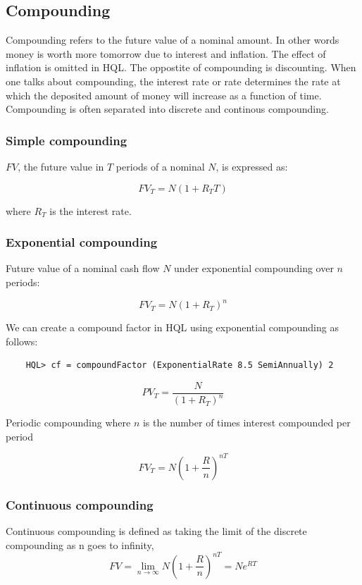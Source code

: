 \documentclass[11pt,a4paper]{article}
\numberwithin{equation}{section}
\begin{document}
\subsection{Compounding}
	Compounding refers to the future value of a nominal amount. In other words money is worth more tomorrow due to interest and inflation. The effect of inflation is omitted in HQL. The oppostite of compounding is discounting.
	When one talks about compounding, the interest rate or rate determines the rate at which the deposited amount of money will increase as a function of time.
	Compounding is often separated into discrete and continous compounding.


	\subsubsection{Simple compounding}
	$FV$, the future value in $T$ periods of a nominal $N$, is expressed as:

	\[
	FV_T = N(1+R_TT)
	\]

	where $R_T$ is the interest rate.

	\subsubsection{Exponential compounding}

	Future value of a nominal cash flow $N$ under exponential compounding over
	$n$ periods:

	\[ FV_T = N(1+R_T)^n \]


	We can create a compound factor in HQL using  exponential compounding as follows:

	\FrameSep
	\begin{lstlisting}
	HQL> cf = compoundFactor (ExponentialRate 8.5 SemiAnnually) 2
	\end{lstlisting}
	\FrameSep

	\[ PV_T = \frac{N}{(1+R_T)^n} \]

	Periodic compounding where $n$ is the number of times interest compounded per period

	\[
	FV_T=N\left( 1 + \frac{R}{n}  \right)^{nT}
	\]

	\subsubsection{Continuous compounding}
	Continuous compounding is defined as taking the limit of the discrete compounding as n goes to infinity,
	\[
	FV=\lim_{n \to \infty} N \left(1+\frac{R}{n}\right)^{nT}=Ne^{RT}
	\]
\end{document}
